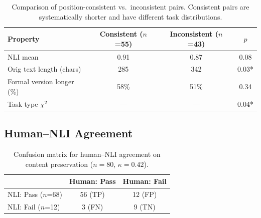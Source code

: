 \documentclass[11pt,a4paper]{article}
\begin{document}
\begin{table}[h]
\centering
\small
\caption{Comparison of position-consistent vs.\ inconsistent pairs. Consistent pairs are systematically shorter and have different task distributions.}
\label{tab:filter_bias}
\begin{tabular}{lccc}
\toprule
\textbf{Property} & \textbf{Consistent ($n$=55)} & \textbf{Inconsistent ($n$=43)} & \textbf{$p$} \\
\midrule
NLI mean & 0.91 & 0.87 & 0.08 \\
Orig text length (chars) & 285 & 342 & 0.03* \\
Formal version longer (\%) & 58\% & 51\% & 0.34 \\
Task type $\chi^2$ & --- & --- & 0.04* \\
\bottomrule
\end{tabular}
\end{table}

\subsection{Human--NLI Agreement}
\label{app:human_nli}

\begin{table}[h]
\centering
\small
\caption{Confusion matrix for human--NLI agreement on content preservation ($n=80$, $\kappa = 0.42$).}
\label{tab:human_nli}
\begin{tabular}{lcc}
\toprule
 & \textbf{Human: Pass} & \textbf{Human: Fail} \\
\midrule
NLI: Pass ($n$=68) & 56 (TP) & 12 (FP) \\
NLI: Fail ($n$=12) & 3 (FN) & 9 (TN) \\
\bottomrule
\end{tabular}
\end{table}
\end{document}
